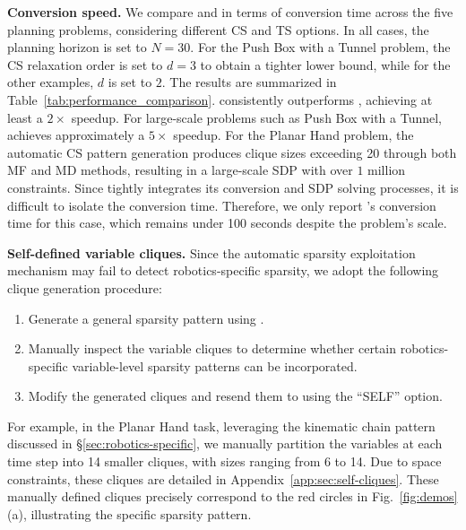 \textbf{Conversion speed.} 
We compare \spot and \tssos in terms of conversion time across the five planning problems, considering different CS and TS options. In all cases, the planning horizon is set to $N = 30$. For the Push Box with a Tunnel problem, the CS relaxation order is set to $d = 3$ to obtain a tighter lower bound, while for the other examples, $d$ is set to $2$.
The results are summarized in Table~\ref{tab:performance_comparison}. \spot consistently outperforms \tssos, achieving at least a $2\times$ speedup. For large-scale problems such as Push Box with a Tunnel, \spot achieves approximately a $5\times$ speedup.
For the Planar Hand problem, the automatic CS pattern generation produces clique sizes exceeding 20 through both MF and MD methods, resulting in a large-scale SDP with over $1$ million constraints. Since \tssos tightly integrates its conversion and SDP solving processes, it is difficult to isolate the conversion time. Therefore, we only report \spot's conversion time for this case, which remains under 100 seconds despite the problem's scale.


\textbf{Self-defined variable cliques.} 
Since the automatic sparsity exploitation mechanism may fail to detect robotics-specific sparsity, we adopt the following clique generation procedure:
\begin{enumerate}
    \item Generate a general sparsity pattern using \spot.
    \item Manually inspect the variable cliques to determine whether certain robotics-specific variable-level sparsity patterns can be incorporated.
    \item Modify the generated cliques and resend them to \spot using the ``SELF'' option.
\end{enumerate}
    
    For example, in the Planar Hand task, leveraging the kinematic chain pattern discussed in \S\ref{sec:robotics-specific}, we manually partition the variables at each time step into 14 smaller cliques, with sizes ranging from 6 to 14. Due to space constraints, these cliques are detailed in Appendix~\ref{app:sec:self-cliques}. These manually defined cliques precisely correspond to the red circles in Fig.~\ref{fig:demos}(a), illustrating the specific sparsity pattern.

